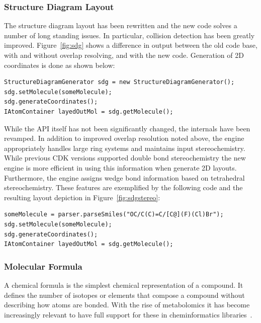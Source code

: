 \documentclass[10pt]{bmcart}
\begin{document}
  \subsubsection*{Structure Diagram Layout}

  The structure diagram layout has been rewritten and the new code solves a
  number of long standing issues. In particular, collision detection has been
  greatly improved. Figure~\ref{fig:sdg} shows a difference in output
  between  
  the old code base, with and without overlap resolving, and with the
  new code. Generation of 2D coordinates is done as shown below:

\vspace{0.2cm}
\begin{verbatim}
StructureDiagramGenerator sdg = new StructureDiagramGenerator();
sdg.setMolecule(someMolecule);
sdg.generateCoordinates();
IAtomContainer layedOutMol = sdg.getMolecule();
\end{verbatim}
\vspace{0.2cm}

  While the API itself has not been significantly changed, the
  internals have been revamped. In addition to improved overlap
  resolution noted above, the engine appropriately handles large ring
  systems and maintains input stereochemistry. While previous CDK
versions supported 
  double bond stereochemistry the new engine is more efficient in
  using this information when generate 2D layouts. Furthermore, the
  engine assigns wedge bond information based on tetrahedral
  stereochemistry. These features are exemplified by the following
  code and the resulting layout depiction in
  Figure~\ref{fig:sdgstereo}:

\vspace{0.2cm}
\begin{verbatim}
someMolecule = parser.parseSmiles("OC/C(C)=C/[C@](F)(Cl)Br");
sdg.setMolecule(someMolecule);
sdg.generateCoordinates();
IAtomContainer layedOutMol = sdg.getMolecule();
\end{verbatim}
\vspace{0.2cm}

 \subsubsection*{Molecular Formula}

A chemical formula is the simplest chemical representation of a
compound.  It defines the number of isotopes or elements that
compose  a compound without describing how atoms
are bonded. With the rise of metabolomics it has become increasingly
relevant to have full support for these in cheminformatics
libraries~\cite{Wolf2010,RojasCherto2011,Pluskal2012,Pluskal2010}.
\end{document}
